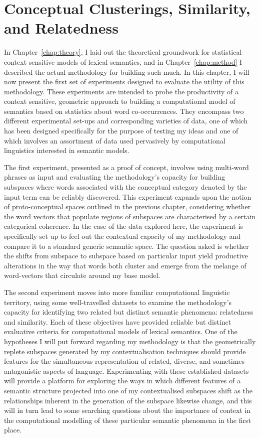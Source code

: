 \chapter{Conceptual Clusterings, Similarity, and Relatedness} \label{chap:literal}
In Chapter~\ref{chap:theory}, I laid out the theoretical groundwork for statistical context sensitive models of lexical semantics, and in Chapter~\ref{chap:method} I described the actual methodology for building such much.  In this chapter, I will now present the first set of experiments designed to evaluate the utility of this methodology.  These experiments are intended to probe the productivity of a context sensitive, geometric approach to building a computational model of semantics based on statistics about word co-occurrences.  They encompass two different experimental set-ups and corresponding varieties of data, one of which has been designed specifically for the purpose of testing my ideas and one of which involves an assortment of data used pervasively by computational linguistics interested in semantic models.

The first experiment, presented as a proof of concept, involves using multi-word phrases as input and evaluating the methodology's capacity for building subspaces where words associated with the conceptual category denoted by the input term can be reliably discovered.  This experiment expands upon the notion of proto-conceptual spaces outlined in the previous chapter, considering whether the word vectors that populate regions of subspaces are characterised by a certain categorical coherence.  In the case of the data explored here, the experiment is specifically set up to feel out the contextual capacity of my methodology and compare it to a standard generic semantic space.  The question asked is whether the shifts from subspace to subspace based on particular input yield productive alterations in the way that words both cluster and emerge from the melange of word-vectors that circulate around my base model.

The second experiment moves into more familiar computational linguistic territory, using some well-travelled datasets to examine the methodology's capacity for identifying two related but distinct semantic phenomena: relatedness and similarity.  Each of these objectives have provided reliable but distinct evaluative criteria for computational models of lexical semantics.  One of the hypotheses I will put forward regarding my methodology is that the geometrically replete subspaces generated by my contextualisation techniques should provide features for the simultaneous representation of related, diverse, and sometimes antagonistic aspects of language.  Experimenting with these established datasets will provide a platform for exploring the ways in which different features of a semantic structure projected into one of my contextualised subspaces shift as the relationships inherent in the generation of the subspace likewise change, and this will in turn lead to some searching questions about the importance of context in the computational modelling of these particular semantic phenomena in the first place.

